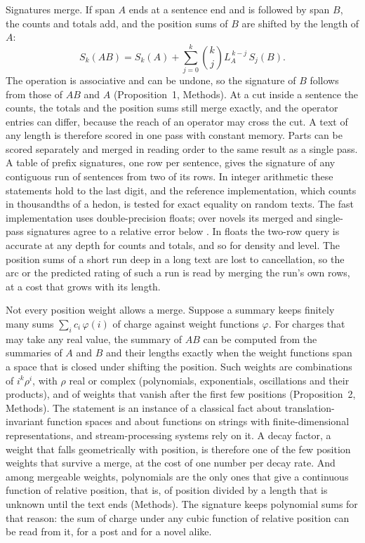 Signatures merge. If span $A$ ends at a sentence end and is followed by span $B$, the counts and totals add, and the position sums of $B$ are shifted by the length of $A$:
\begin{equation}
S_{k}(AB)=S_{k}(A)+\sum_{j=0}^{k}\binom{k}{j}L_A^{\,k-j}\,S_{j}(B).
\label{eq:merge}
\end{equation}
The operation is associative and can be undone, so the signature of $B$ follows from those of $AB$ and $A$ (Proposition~1, Methods). At a cut inside a sentence the counts, the totals and the position sums still merge exactly, and the operator entries can differ, because the reach of an operator may cross the cut. A text of any length is therefore scored in one pass with constant memory. Parts can be scored separately and merged in reading order to the same result as a single pass. A table of prefix signatures, one row per sentence, gives the signature of any contiguous run of sentences from two of its rows. In integer arithmetic these statements hold to the last digit, and the reference implementation, which counts in thousandths of a hedon, is tested for exact equality on random texts. The fast implementation uses double-precision floats; over \nNovels{} novels its merged and single-pass signatures agree to a relative error below \mergeErr. In floats the two-row query is accurate at any depth for counts and totals, and so for density and level. The position sums of a short run deep in a long text are lost to cancellation, so the arc or the predicted rating of such a run is read by merging the run's own rows, at a cost that grows with its length.

Not every position weight allows a merge. Suppose a summary keeps finitely many sums $\sum_i c_i\,\varphi(i)$ of charge against weight functions $\varphi$. For charges that may take any real value, the summary of $AB$ can be computed from the summaries of $A$ and $B$ and their lengths exactly when the weight functions span a space that is closed under shifting the position. Such weights are combinations of $i^{k}\rho^{i}$, with $\rho$ real or complex (polynomials, exponentials, oscillations and their products), and of weights that vanish after the first few positions (Proposition~2, Methods). The statement is an instance of a classical fact about translation-invariant function spaces\cite{anselone1964,szekelyhidi1982} and about functions on strings with finite-dimensional representations\cite{schutzenberger1961,berstel2010}, and stream-processing systems rely on it\cite{cormode2009}. A decay factor, a weight that falls geometrically with position, is therefore one of the few position weights that survive a merge, at the cost of one number per decay rate. And among mergeable weights, polynomials are the only ones that give a continuous function of relative position, that is, of position divided by a length that is unknown until the text ends (Methods). The signature keeps polynomial sums for that reason: the sum of charge under any cubic function of relative position can be read from it, for a post and for a novel alike.

